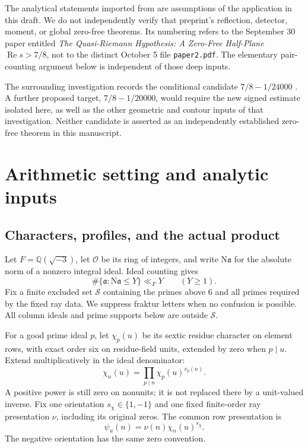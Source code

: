 \documentclass[11pt]{article}
\theoremstyle{definition}
\theoremstyle{remark}
\numberwithin{equation}{section}
\newcommand{\Nm}{\mathrm N}
\newcommand{\OO}{\mathcal O}
\newcommand{\Rea}{\operatorname{Re}}
\begin{document}
The analytical statements imported from \cite{openai} are assumptions
of the application in this draft. We do not independently verify that
preprint's reflection, detector, moment, or global zero-free theorems.
Its numbering refers to the September 30 paper entitled
\emph{The Quasi-Riemann Hypothesis: A Zero-Free Half-Plane
$\Rea s>7/8$}, not to the distinct October 5 file
\texttt{paper2.pdf}. The elementary pair-counting argument below is
independent of those deep inputs.

The surrounding investigation records the conditional candidate
$7/8-1/24000$ \cite{records}. A further proposed target,
$7/8-1/20000$, would require the new signed estimate isolated here,
as well as the other geometric and contour inputs of that investigation.
Neither candidate is asserted as an independently established
zero-free theorem in this manuscript.

\section{Arithmetic setting and analytic inputs}\label{sec:setting}

\subsection{Characters, profiles, and the actual product}

Let $F=\mathbb Q(\sqrt{-3})$, let $\OO$ be its ring of integers, and
write $\Nm\mathfrak a$ for the absolute norm of a nonzero integral
ideal. Ideal counting gives
\begin{equation}\label{eq:ideal-count}
\#\{\mathfrak a:\Nm\mathfrak a\le Y\}\ll_F Y\qquad(Y\ge1).
\end{equation}
Fix a finite excluded set $\mathcal S$ containing the primes above $6$
and all primes required by the fixed ray data. We suppress fraktur
letters when no confusion is possible. All column ideals and prime
supports below are outside $\mathcal S$.

For a good prime ideal $p$, let $\chi_p(u)$ be its sextic residue
character on element rows, with exact order six on residue-field units,
extended by zero when $p\mid u$. Extend multiplicatively in the ideal
denominator:
\[
\chi_n(u)=\prod_{p\mid n}\chi_p(u)^{v_p(n)}.
\]
A positive power is still zero on nonunits; it is not replaced there
by a unit-valued inverse. Fix one orientation $s_\chi\in\{1,-1\}$ and
one fixed finite-order ray presentation $\nu$, including its original
zeros. The common row presentation is
\begin{equation}\label{eq:presentation}
\psi_u(n)=\nu(n)\chi_n(u)^{s_\chi}.
\end{equation}
The negative orientation has the same zero convention.
\end{document}
